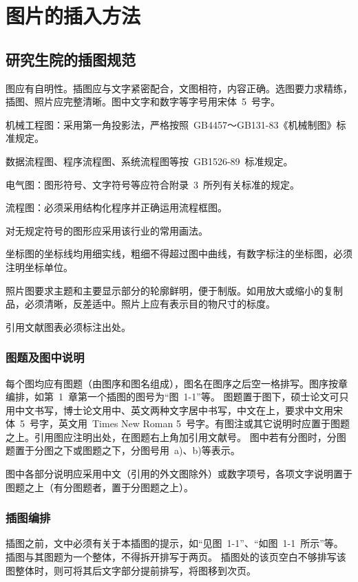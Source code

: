 \section{图片的插入方法}
\subsection{研究生院的插图规范}
图应有自明性。插图应与文字紧密配合，文图相符，内容正确。选图要力求精练，插图、照片应完整清晰。图中文字和数字等字号用宋体~5~号字。

机械工程图：采用第一角投影法，严格按照~GB4457～GB131-83《机械制图》标准规定。

数据流程图、程序流程图、系统流程图等按~GB1526-89~标准规定。

电气图：图形符号、文字符号等应符合附录~3~所列有关标准的规定。

流程图：必须采用结构化程序并正确运用流程框图。

对无规定符号的图形应采用该行业的常用画法。

坐标图的坐标线均用细实线，粗细不得超过图中曲线，有数字标注的坐标图，必须注明坐标单位。

照片图要求主题和主要显示部分的轮廓鲜明，便于制版。如用放大或缩小的复制品，必须清晰，反差适中。照片上应有表示目的物尺寸的标度。

引用文献图表必须标注出处。


\subsubsection{图题及图中说明}
每个图均应有图题（由图序和图名组成），图名在图序之后空一格排写。图序按章编排，如第~1~章第一个插图的图号为“图~1-1”等。
图题置于图下，硕士论文可只用中文书写，博士论文用中、英文两种文字居中书写，中文在上，要求中文用宋体~5~号字，英文用~Times New Roman 5~号字。有图注或其它说明时应置于图题之上。引用图应注明出处，在图题右上角加引用文献号。
图中若有分图时，分图题置于分图之下或图题之下，分图号用~a)、b)等表示。

图中各部分说明应采用中文（引用的外文图除外）或数字项号，各项文字说明置于图题之上（有分图题者，置于分图题之上）。

\subsubsection{插图编排}
插图之前，文中必须有关于本插图的提示，如“见图~1-1”、“如图~1-1~所示”等。插图与其图题为一个整体，不得拆开排写于两页。
插图处的该页空白不够排写该图整体时，则可将其后文字部分提前排写，将图移到次页。


